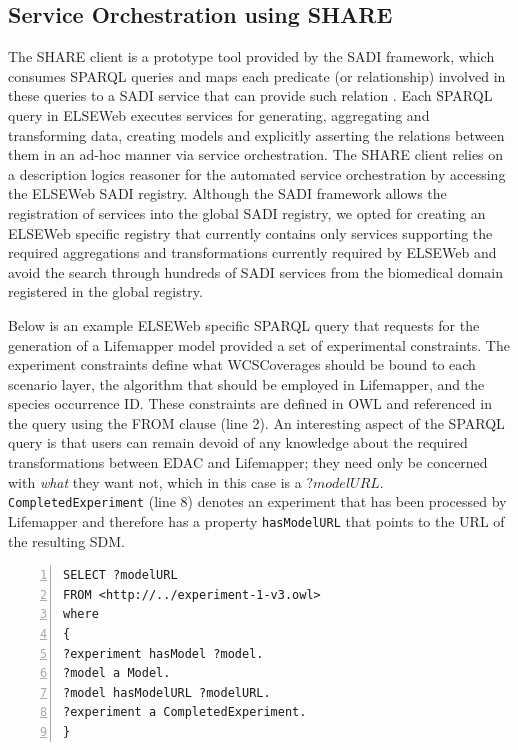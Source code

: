 \documentclass[letterpaper]{article}
\begin{document}
\subsection{Service Orchestration using SHARE}
The SHARE client is a prototype tool provided by the SADI framework, which consumes SPARQL queries and maps each predicate (or relationship) involved in these queries to a SADI service that can provide such relation \cite{wilkinson2011semantic}. Each SPARQL query in ELSEWeb executes services for generating, aggregating and transforming data, creating models and explicitly asserting the relations between them in an ad-hoc manner via service orchestration. The SHARE client relies on a description logics reasoner for the automated service orchestration by accessing the ELSEWeb SADI registry. Although the SADI framework allows the registration of services into the global SADI registry, we opted for creating an ELSEWeb specific registry that currently contains only services supporting the required aggregations and transformations currently required by ELSEWeb and avoid the search through hundreds of SADI services from the biomedical domain registered in the global registry.

Below is an example ELSEWeb specific SPARQL query that requests for the generation of a Lifemapper model provided a set of experimental constraints. The experiment constraints define what WCSCoverages should be bound to each scenario layer, the algorithm that should be employed in Lifemapper, and the species occurrence ID. These constraints are defined in OWL and referenced in the query using the FROM clause (line 2). An interesting aspect of the SPARQL query is that users can remain devoid of any knowledge about the required transformations between EDAC and Lifemapper; they need only be concerned with {\em what} they want not, which in this case is a $?modelURL$. {\tt CompletedExperiment} (line 8) denotes an experiment that has been processed by Lifemapper and therefore has a property {\tt hasModelURL} that points to the URL of the resulting SDM.

\begin{lstlisting}[numbers=left,numberstyle=\footnotesize,basicstyle=\footnotesize]
SELECT ?modelURL
FROM <http://../experiment-1-v3.owl>
where
{
?experiment hasModel ?model.
?model a Model.
?model hasModelURL ?modelURL.
?experiment a CompletedExperiment.
}
\end{lstlisting}
\end{document}
